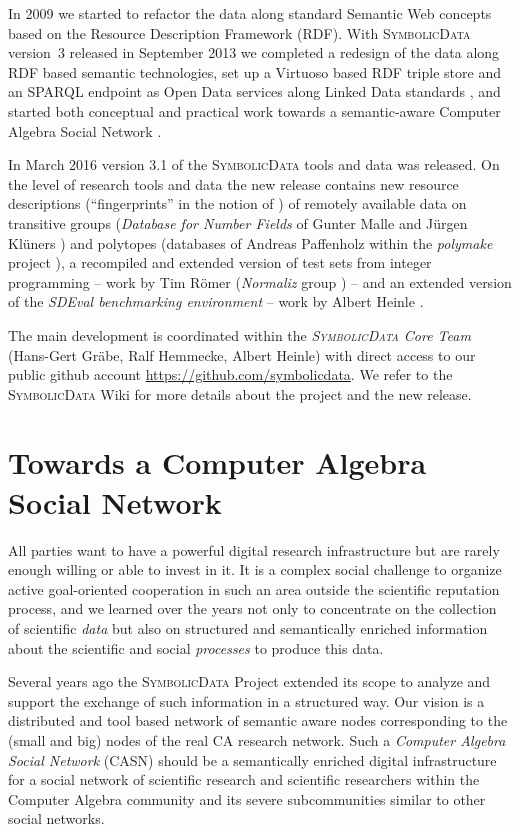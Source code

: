 \documentclass{mathincs}
\newcommand{\SD}{\textsc{Symbo\-lic\-Data}}
\begin{document}
In 2009 we started to refactor the data along standard Semantic Web concepts
based on the Resource Description Framework (RDF).  With {\SD} version~3
released in September 2013 we completed a redesign of the data along RDF based
semantic technologies, set up a Virtuoso based RDF triple store and an SPARQL
endpoint as Open Data services along Linked Data standards \cite{lod}, and
started both conceptual and practical work towards a semantic-aware Computer
Algebra Social Network \cite{cicm-14}.

In March 2016 version 3.1 of the {\SD} tools and data was released. On the
level of research tools and data the new release contains new resource
descriptions (``fingerprints'' in the notion of \cite{cicm-14}) of remotely
available data on transitive groups (\emph{Database for Number Fields} of
Gunter Malle and J\"urgen Kl\"uners \cite{MalleKlueners}) and polytopes
(databases of Andreas Paffenholz \cite{Paffenholz} within the \emph{polymake}
project \cite{polymake}), a recompiled and extended version of test sets from
integer programming -- work by Tim R\"omer (\emph{Normaliz} group
\cite{normaliz}) -- and an extended version of the \emph{SDEval benchmarking
  environment} -- work by Albert Heinle \cite{heinle-15}.

The main development is coordinated within the \emph{{\SD} Core Team}
(Hans-Gert Gr\"abe, Ralf Hemmecke, Albert Heinle) with direct access to our
public github account \url{https://github.com/symbolicdata}.  We refer to the
{\SD} Wiki \cite{sdwiki} for more details about the project and the new
release.

\section{Towards a Computer Algebra Social Network}

All parties want to have a powerful digital research infrastructure but are
rarely enough willing or able to invest in it.  It is a complex social
challenge to organize active goal-oriented cooperation in such an area outside
the scientific reputation process, and we learned over the years not only to
concentrate on the collection of scientific \emph{data} but also on structured
and semantically enriched information about the scientific and social
\emph{processes} to produce this data.

Several years ago the {\SD} Project extended its scope to analyze and support
the exchange of such information in a structured way.  Our vision is a
distributed and tool based network of semantic aware nodes corresponding to
the (small and big) nodes of the real CA research network.  Such a
\emph{Computer Algebra Social Network} (CASN) should be a semantically
enriched digital infrastructure for a social network of scientific research
and scientific researchers within the Computer Algebra community and its
severe subcommunities similar to other social networks.
\end{document}
